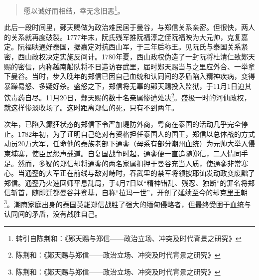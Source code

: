 \begin{quote}

愿以诚好而相结，幸无念旧恶\footnote{转引自陈荆和：《鄚天赐与郑信——政治立场、冲突及时代背景之研究》}。

\end{quote}

此后一段时间里，鄚天赐做为政治难民居于曼谷，与郑信关系亲密。但很快，两人的关系就再度破裂。1777年末，阮氏残军推阮福淳之侄阮福映为大元帅，克复嘉定。阮福映通好泰国，据嘉定对抗西山军，于三年后称王。见阮氏与泰国关系紧密，西山政权决定实施反间计。1780年夏，西山政权伪造了一封阮将杜清仁致鄚天赐的密信，内称越南船队将不日造访吞武里，届时鄚天赐当与之里应外合、一举拿下曼谷。当时，步入晚年的郑信已因自己血统和认同间的矛盾陷入精神疾病，变得暴躁易怒、多疑好杀。盛怒之下，郑信将无辜的鄚天赐投入监狱，于11月1日迫其饮毒药自尽。11月20日，鄚天赐的数十名亲属惨遭处决\footnote{陈荆和：《鄚天赐与郑信——政治立场、冲突及时代背景之研究》}。盛极一时的河仙政权，就这样惨淡收场了。这时距离郑信的死，只有不到两年。

次年，已陷入癫狂状态的郑信下令严加堤防外商，粤商在泰国的活动几乎完全停止。1782年初，为了证明自己绝对有资格担任泰国人的国王，郑信以总体战的方式动员20万大军，任命他的泰族老部下通銮（母系有部分潮州血统）为元帅大举入侵柬埔寨，使臣民怨声载道。自复国战争时起，通銮便一直追随郑信，二人情同手足。然而，多疑的郑信却将通銮的两名家属扣押于曼谷充当人质，使通銮非常寒心。当通銮的大军正在前线与敌对峙时，吞武里的禁军将领披耶讪发动政变废黜了郑信。通銮乃火速回师平息乱局，于4月7日以“精神错乱、残忍、独断”的罪名将郑信斩首，随即迁都曼谷并登基，自称“拉玛一世”，开创了延续至今的却克里王朝\footnote{陈荆和：《鄚天赐与郑信——政治立场、冲突及时代背景之研究》}。潮商家庭出身的泰国英雄郑信战胜了强大的缅甸侵略者，但最终受困于血统与认同间的矛盾，没有战胜自己。

